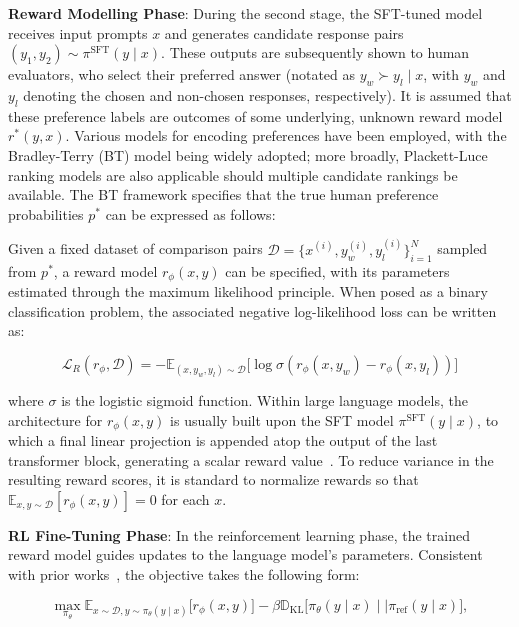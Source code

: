 \textbf{Reward Modelling Phase}: During the second stage, the SFT-tuned model receives input prompts $x$ and generates candidate response pairs $(y_1, y_2)\sim \pi^\text{SFT}(y \mid x)$. These outputs are subsequently shown to human evaluators, who select their preferred answer (notated as $y_w\succ y_l \mid x$, with $y_w$ and $y_l$ denoting the chosen and non-chosen responses, respectively). It is assumed that these preference labels are outcomes of some underlying, unknown reward model $r^*(y, x)$. Various models for encoding preferences have been employed, with the Bradley-Terry (BT) model \cite{bradley1952rankanalysis} being widely adopted; more broadly, Plackett-Luce ranking models \citep{plackett1975analysis, luce2012individual} are also applicable should multiple candidate rankings be available. The BT framework specifies that the true human preference probabilities $p^*$ can be expressed as follows:

Given a fixed dataset of comparison pairs $\mathcal{D}=\bigl\{x^{(i)}, y_w^{(i)}, y_l^{(i)}\bigr\}_{i=1}^N$ sampled from $p^*$, a reward model $r_{\phi}(x, y)$ can be specified, with its parameters estimated through the maximum likelihood principle. When posed as a binary classification problem, the associated negative log-likelihood loss can be written as:

\begin{equation}\label{eq:reward_model}
    \mathcal{L}_R(r_{\phi}, \mathcal{D}) = -\mathbb{E}_{(x, y_w, y_l)\sim \mathcal{D}}\bigl[\log \sigma(r_{\phi}(x, y_w)- r_{\phi}(x, y_l))\bigr]
\end{equation}

where $\sigma$ is the logistic sigmoid function. Within large language models, the architecture for $r_{\phi}(x, y)$ is usually built upon the SFT model $\pi^\text{SFT}(y \mid x)$, to which a final linear projection is appended atop the output of the last transformer block, generating a scalar reward value~\cite{ziegler2020finetuning}. To reduce variance in the resulting reward scores, it is standard to normalize rewards so that $\mathbb{E}_{x,y\sim \mathcal{D}}\left[r_\phi(x, y)\right] = 0$ for each $x$.

\textbf{RL Fine-Tuning Phase}: In the reinforcement learning phase, the trained reward model guides updates to the language model’s parameters. Consistent with prior works~\citep{jaques2017sequence, jaques2020human}, the objective takes the following form:

\begin{equation}\label{eq:RL}
\max_{\pi_{\theta}}  \mathbb{E}_{x\sim \mathcal{D}, y\sim \pi_{\theta}(y \mid x)}\bigl[r_{\phi}(x, y)\bigr] - \beta\mathbb{D}_{\textrm{KL}}\bigl[\pi_{\theta}(y\mid x)\mid \mid \pi_\text{ref}(y\mid x)\bigr],
\end{equation}

